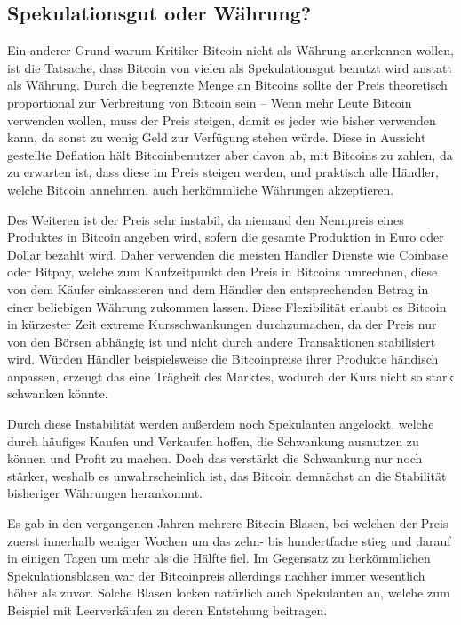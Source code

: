 \subsection{Spekulationsgut oder Währung?}
\label{sec:speculation}

Ein anderer Grund warum Kritiker Bitcoin nicht als Währung anerkennen wollen, ist die Tatsache, dass Bitcoin von vielen als Spekulationsgut benutzt wird anstatt als Währung.
Durch die begrenzte Menge an Bitcoins sollte der Preis theoretisch proportional zur Verbreitung von Bitcoin sein -- Wenn mehr Leute Bitcoin verwenden wollen, muss der Preis steigen, damit es jeder wie bisher verwenden kann, da sonst zu wenig Geld zur Verfügung stehen würde.
Diese in Aussicht gestellte Deflation hält Bitcoinbenutzer aber davon ab, mit Bitcoins zu zahlen, da zu erwarten ist, dass diese im Preis steigen werden, und praktisch alle Händler, welche Bitcoin annehmen, auch herkömmliche Währungen akzeptieren.

Des Weiteren ist der Preis sehr instabil, da niemand den Nennpreis eines Produktes in Bitcoin angeben wird, sofern die gesamte Produktion in Euro oder Dollar bezahlt wird.
Daher verwenden die meisten Händler Dienste wie Coinbase oder Bitpay, welche zum Kaufzeitpunkt den Preis in Bitcoins umrechnen, diese von dem Käufer einkassieren und dem Händler den entsprechenden Betrag in einer beliebigen Währung zukommen lassen.
Diese Flexibilität erlaubt es Bitcoin in kürzester Zeit extreme Kursschwankungen durchzumachen, da der Preis nur von den Börsen abhängig ist und nicht durch andere Transaktionen stabilisiert wird.
Würden Händler beispielsweise die Bitcoinpreise ihrer Produkte händisch anpassen, erzeugt das eine Trägheit des Marktes, wodurch der Kurs nicht so stark schwanken könnte.

Durch diese Instabilität werden außerdem noch Spekulanten angelockt, welche durch häufiges Kaufen und Verkaufen hoffen, die Schwankung ausnutzen zu können und Profit zu machen.
Doch das verstärkt die Schwankung nur noch stärker, weshalb es unwahrscheinlich ist, das Bitcoin demnächst an die Stabilität bisheriger Währungen herankommt.

Es gab in den vergangenen Jahren mehrere Bitcoin-Blasen, bei welchen der Preis zuerst innerhalb weniger Wochen um das zehn- bis hundertfache stieg und darauf in einigen Tagen um mehr als die Hälfte fiel.
Im Gegensatz zu herkömmlichen Spekulationsblasen war der Bitcoinpreis allerdings nachher immer wesentlich höher als zuvor.
Solche Blasen locken natürlich auch Spekulanten an, welche zum Beispiel mit Leerverkäufen zu deren Entstehung beitragen.

